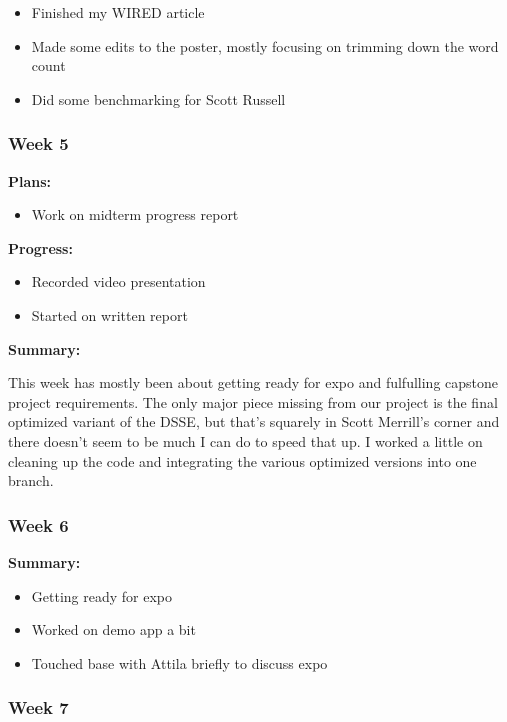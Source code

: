\begin{itemize}
\item     Finished my WIRED article
\item     Made some edits to the poster, mostly focusing on trimming down the word count
\item     Did some benchmarking for Scott Russell
\end{itemize}

\subsubsection{Week 5}
\noindent \textbf{Plans: }

\begin{itemize}
\item     Work on midterm progress report
\end{itemize}

\noindent \textbf{Progress: }

\begin{itemize}
\item     Recorded video presentation
\item     Started on written report
\end{itemize}


\noindent \textbf{Summary: }

This week has mostly been about getting ready for expo and fulfulling capstone project requirements. The only major piece missing from our project is the final optimized variant of the DSSE, but that's squarely in Scott Merrill's corner and there doesn't seem to be much I can do to speed that up. I worked a little on cleaning up the code and integrating the various optimized versions into one branch. 

\subsubsection{Week 6}

\noindent \textbf{Summary: }

\begin{itemize}
\item     Getting ready for expo

\item     Worked on demo app a bit

\item     Touched base with Attila briefly to discuss expo
\end{itemize}

\subsubsection{Week 7}

